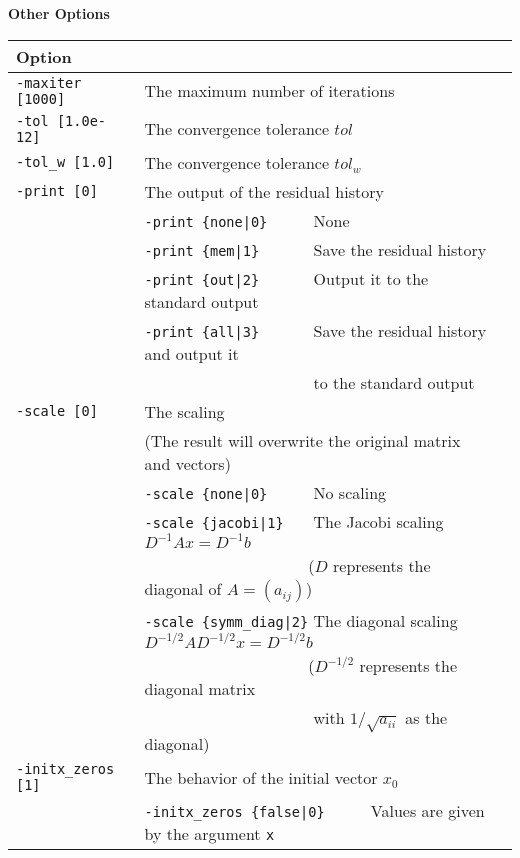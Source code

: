 \documentclass[a4paper]{article}
\begin{document}
\begin{minipage}[t]{\textwidth}
\begin{center}
{\bf Other Options}\\
\begin{tabular}{l|ll}\hline\hline
Option &                          \\ \hline
\verb=-maxiter [1000]= & The maximum number of iterations         \\ 
\verb=-tol [1.0e-12]=  & The convergence tolerance $tol$            \\
\verb=-tol_w [1.0]=    & The convergence tolerance $tol_w$  \\
\verb=-print [0]=      & The output of the residual history                \\
                       & \verb=-print {none|0}     =  None \\
                       & \verb=-print {mem|1}      =  Save the residual history\\
                       & \verb=-print {out|2}      =  Output it to the standard output\\
                       & \verb=-print {all|3}      =  Save the residual history and output it \\ 
                       & \verb=                    =  to the standard output \\
\verb=-scale [0]=      & The scaling \\
                       & (The result will overwrite the original matrix and vectors) \\
                       & \verb=-scale {none|0}     =  No scaling \\ 
                       & \verb=-scale {jacobi|1}   =  The Jacobi scaling $D^{-1}Ax=D^{-1}b$ \\
                       & \verb=                    =  ($D$ represents the diagonal of $A=(a_{ij})$)\\
                       & \verb=-scale {symm_diag|2}=  The diagonal scaling $D^{-1/2}AD^{-1/2}x=D^{-1/2}b$ \\
                       & \verb=                    =  ($D^{-1/2}$ represents the diagonal matrix \\
                       & \verb=                    =  with $1/\sqrt{a_{ii}}$ as the diagonal) \\ 
\verb=-initx_zeros [1]= & The behavior of the initial vector $x_{0}$  \\
                       & \verb=-initx_zeros {false|0}     =  Values are given by the argument \verb=x= \\

\end{tabular}
\end{center}
\end{minipage}
\end{document}
